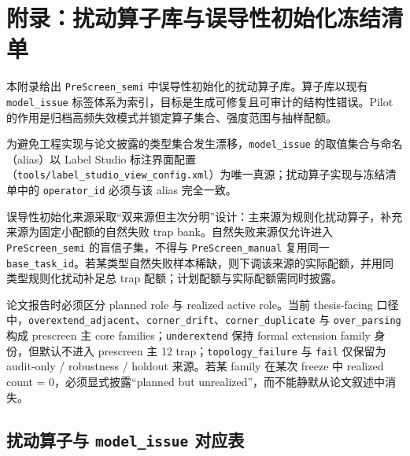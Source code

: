 \section{附录：扰动算子库与误导性初始化冻结清单}\label{app:perturbation-library}

本附录给出 \texttt{PreScreen\_semi} 中误导性初始化的扰动算子库。算子库以现有 \texttt{model\_issue} 标签体系为索引，目标是生成可修复且可审计的结构性错误。Pilot 的作用是归档高频失效模式并锁定算子集合、强度范围与抽样配额。

为避免工程实现与论文披露的类型集合发生漂移，\texttt{model\_issue} 的取值集合与命名（alias）以 Label Studio 标注界面配置（\texttt{tools/label\_studio\_view\_config.xml}）为唯一真源；扰动算子实现与冻结清单中的 \texttt{operator\_id} 必须与该 alias 完全一致。

误导性初始化来源采取“双来源但主次分明”设计：主来源为规则化扰动算子，补充来源为固定小配额的自然失败 trap bank。自然失败来源仅允许进入 \texttt{PreScreen\_semi} 的盲信子集，不得与 \texttt{PreScreen\_manual} 复用同一 \texttt{base\_task\_id}。若某类型自然失败样本稀缺，则下调该来源的实际配额，并用同类型规则化扰动补足总 trap 配额；计划配额与实际配额需同时披露。

论文报告时必须区分 planned role 与 realized active role。当前 thesis-facing 口径中，\texttt{overextend\_adjacent}、\texttt{corner\_drift}、\texttt{corner\_duplicate} 与 \texttt{over\_parsing} 构成 prescreen 主 core families；\texttt{underextend} 保持 formal extension family 身份，但默认不进入 prescreen 主 12 trap；\texttt{topology\_failure} 与 \texttt{fail} 仅保留为 audit-only / robustness / holdout 来源。若某 family 在某次 freeze 中 realized count = 0，必须显式披露“planned but unrealized”，而不能静默从论文叙述中消失。

\subsection{扰动算子与 \texttt{model\_issue} 对应表}\label{app:perturbation-operators}


